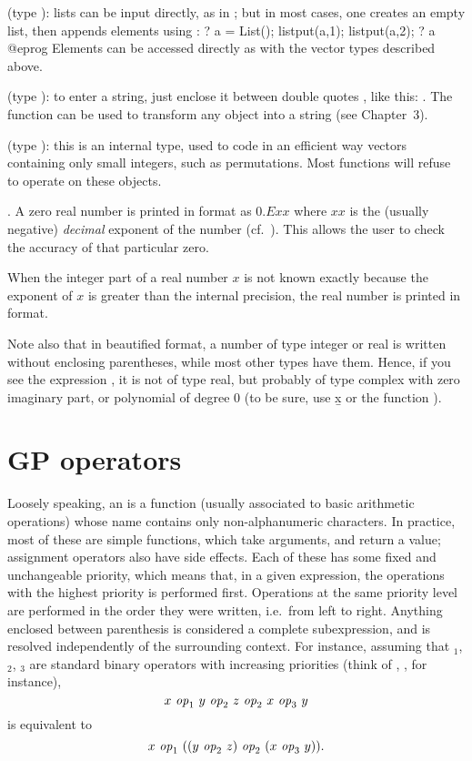  (type ): lists can be input
directly, as in ; but in most cases, one creates
an empty list, then appends elements using :
\bprog
  ? a = List(); listput(a,1); listput(a,2);
  ? a
@eprog\noindent
Elements can be accessed directly as with the vector types described above.

 (type ): to
enter a string, just enclose it between double quotes , like this:
. The function  can be used to transform any
object into a string (see Chapter~3).

 (type ): this is an internal type,
used to code in an efficient way vectors containing only small integers, such
as permutations. Most  functions will refuse to operate on these
objects.

. A zero real number is printed in 
format as $0.Exx$ where $xx$ is the (usually negative) \emph{decimal}
exponent of the number (cf.~). This allows the user to
check the accuracy of that particular zero.

When the integer part of a real number $x$ is not known exactly because the
exponent of $x$ is greater than the internal precision, the real number is
printed in  format.

Note also that in beautified format, a number of type integer or real is
written without enclosing parentheses, while most other types have them.
Hence, if you see the expression , it is not of type real, but
probably of type complex with zero imaginary part, or polynomial of degree $0$
(to be sure, use \b{x} or the function ).

\section{GP operators}\label{se:operators}

\noindent Loosely speaking, an  is a function (usually
associated to basic arithmetic operations) whose name contains only
non-alphanumeric characters. In practice, most of these are simple functions,
which take arguments, and return a value; assignment operators also have side
effects. Each of these has some fixed and unchangeable priority, which means
that, in a given expression, the operations with the highest priority is
performed first. Operations at the same priority level are performed in the
order they were written, i.e.~from left to right. Anything enclosed between
parenthesis is considered a complete subexpression, and is resolved
independently of the surrounding context. For instance, assuming that
$_1$, $_2$, $_3$ are standard binary operators with
increasing priorities (think of \kbd{+}, \kbd{*}, \kbd{\pow} for instance),
$$ x~\hbox{\it op\/}_1~y~\hbox{\it op\/}_2~z~\hbox{\it op\/}_2~x~\hbox{\it op\/}_3~y $$ is
equivalent to $$ x~\hbox{\it op\/}_1~((y~\hbox{\it op\/}_2~z)~\hbox{\it op\/}_2~
(x~\hbox{\it op\/}_3~y)).$$

